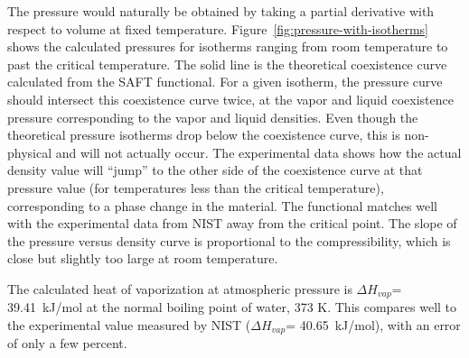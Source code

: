 \documentclass[letterpaper,twocolumn,amsmath,amssymb,prb]{revtex4-1}
\begin{document}
The pressure would naturally be obtained by taking a partial
derivative with respect to volume at fixed temperature. 
Figure~\ref{fig:pressure-with-isotherms} shows the calculated pressures for
isotherms ranging from room temperature to past the critical temperature. The
solid line is the theoretical coexistence curve calculated from the SAFT
functional. For a given isotherm, the pressure curve should intersect this
coexistence curve twice, at the vapor and liquid coexistence 
pressure corresponding to the vapor and liquid densities. Even
though the theoretical pressure isotherms drop below the coexistence curve,
this is non-physical and will not actually occur. The experimental data shows
how the actual density value will ``jump'' to the other side of 
the coexistence curve at that pressure value (for
temperatures less than the critical temperature), corresponding to a phase 
change in the material. The
functional matches well with the experimental data from NIST away from the
critical point. The slope of the pressure versus density curve is proportional
to the compressibility, which is close but slightly too large at room
temperature. 




The calculated heat of vaporization at atmospheric pressure is
$\Delta H_{vap}$= 39.41~kJ/mol at the normal boiling point of water,
373 K. This compares well to the experimental
value measured by NIST ($\Delta H_{vap}$= 40.65~kJ/mol\cite{nistwater}), with 
an error of only a few percent.
\end{document}
